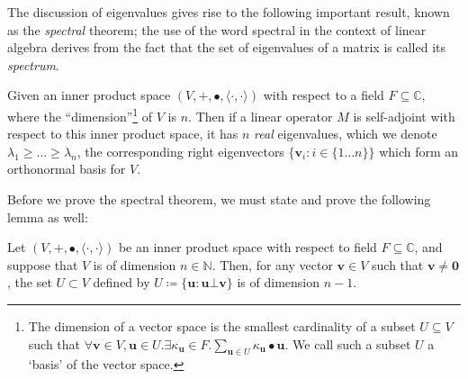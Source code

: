 	The discussion of eigenvalues gives rise to the following important result, known as the 
	\emph{spectral} theorem; the use of the word spectral in the context of linear algebra 
	derives from the fact that the set of eigenvalues of a matrix is called its 
	\emph{spectrum}.
	\begin{theorem}
		\label{theorem:spectral}
		Given an inner product space $(V, + , \bullet, \langle \cdot,\cdot\rangle)$ with 
		respect to a field $F\subseteq \mathbb{C}$, where the ``dimension''\footnote{The 
		dimension of a vector space is the smallest cardinality of a subset $U \subseteq V
		$ such that $\forall \mathbf{v} \in V,  \mathbf{u} \in U. \exists \kappa_\mathbf{u}
		\in F . \sum_{\mathbf{u}\in U} \kappa_\mathbf{u}\bullet\mathbf{u}$. 
		We call such a subset $U$ a `basis' of the vector space.} 
		of $V$ is $n$. Then if a linear operator $M$ is self-adjoint 
		with respect to this inner product space, it has $n$ \emph{real} eigenvalues, 
		which we denote $\lambda_1 \geq \hdots \geq \lambda_n$, the corresponding right 
		eigenvectors $\{\mathbf{v}_i : i \in \{1\hdots n\}\}$ which form an orthonormal 
		basis for $V$.
	\end{theorem}
	Before we prove the spectral theorem, we must state and prove the following lemma as well:
	\begin{lemma}
		\label{lemma:spectralhelp}
		Let $(V, + , \bullet, \langle\cdot,\cdot\rangle)$ be an inner product space with 
		respect to field $F \subseteq \mathbb{C}$, and suppose that $V$ is of dimension $n 
		\in \mathbb{N}$. Then, for any vector $\mathbf{v}\in V$ such that $\mathbf{v}\neq 
		\mathbf{0}$, the set $U\subset V$ defined by $U \coloneqq \{\mathbf{u} : \mathbf{u}
		\bot \mathbf{v}\}$ is of dimension $n-1$.
	\end{lemma}
